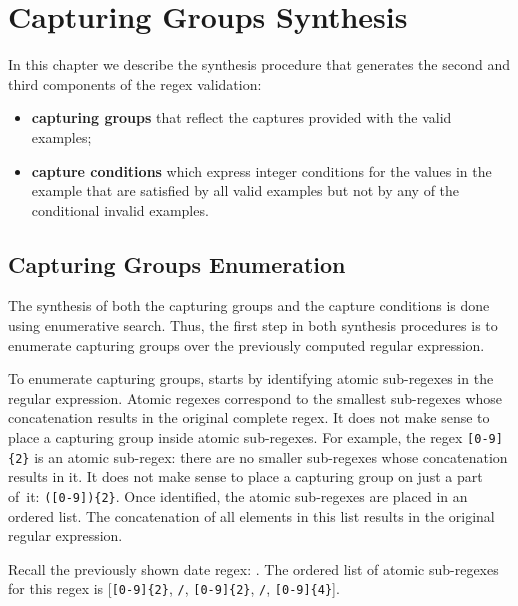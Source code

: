 \chapter{Capturing Groups Synthesis}


In this chapter we describe the synthesis procedure that generates the second and third components of the regex validation:
\begin{itemize}
    \item \textbf{capturing groups} that reflect the captures provided with the valid examples;
    \item \textbf{capture conditions} which express integer conditions for the values in the example that are satisfied by all valid examples but not by any of the conditional invalid examples. 
\end{itemize}

    
\section{Capturing Groups Enumeration}\label{sec:cap_groups_enumeration}
The synthesis of both the capturing groups and the capture conditions is done using enumerative search. Thus, the first step in both synthesis procedures is to enumerate capturing groups over the previously computed regular expression.

To enumerate capturing groups, \Forest starts by identifying atomic sub-regexes in the regular expression.
Atomic regexes correspond to the smallest sub-regexes whose concatenation results in the original complete regex.
It does not make sense to place a capturing group inside atomic sub-regexes. For example, the regex \verb![0-9]{2}! is an atomic sub-regex: there are no smaller sub-regexes whose concatenation results in it. It does not make sense to place a capturing group on just a part of~it: \verb!([0-9]){2}!.
Once identified, the atomic sub-regexes are placed in an ordered list. The concatenation of all elements in this list results in the original regular expression.

\begin{example}
Recall the previously shown date regex: . The ordered list of atomic sub-regexes for this regex is [\verb![0-9]{2}!, \verb!/!, \verb![0-9]{2}!, \verb!/!, \verb![0-9]{4}!].
\end{example}

